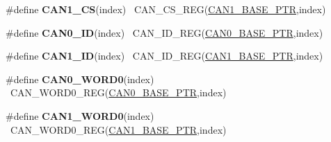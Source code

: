 \begin{DoxyCompactItemize}
\item 
\hypertarget{group___c_a_n___register___accessor___macros_ga70afb0e5509292d14467ead72cc74e03}{}\#define {\bfseries C\+A\+N1\+\_\+\+C\+S}(index)                                                  ~C\+A\+N\+\_\+\+C\+S\+\_\+\+R\+E\+G(\hyperlink{group___c_a_n___peripheral_ga810387eeeb9ccd0e09ae057ff6f0d2ca}{C\+A\+N1\+\_\+\+B\+A\+S\+E\+\_\+\+P\+T\+R},index)\label{group___c_a_n___register___accessor___macros_ga70afb0e5509292d14467ead72cc74e03}

\item 
\hypertarget{group___c_a_n___register___accessor___macros_gac7b043c2201389dfe416e3f5166db6cc}{}\#define {\bfseries C\+A\+N0\+\_\+\+I\+D}(index)                                                  ~C\+A\+N\+\_\+\+I\+D\+\_\+\+R\+E\+G(\hyperlink{group___c_a_n___peripheral_ga1ee8f499e10af9b8e3132e0168e519b9}{C\+A\+N0\+\_\+\+B\+A\+S\+E\+\_\+\+P\+T\+R},index)\label{group___c_a_n___register___accessor___macros_gac7b043c2201389dfe416e3f5166db6cc}

\item 
\hypertarget{group___c_a_n___register___accessor___macros_ga6363290fa493350368cf139282eb1489}{}\#define {\bfseries C\+A\+N1\+\_\+\+I\+D}(index)                                                  ~C\+A\+N\+\_\+\+I\+D\+\_\+\+R\+E\+G(\hyperlink{group___c_a_n___peripheral_ga810387eeeb9ccd0e09ae057ff6f0d2ca}{C\+A\+N1\+\_\+\+B\+A\+S\+E\+\_\+\+P\+T\+R},index)\label{group___c_a_n___register___accessor___macros_ga6363290fa493350368cf139282eb1489}

\item 
\hypertarget{group___c_a_n___register___accessor___macros_gaa0a859ba1ce74eaa3d818f7f3c33b81c}{}\#define {\bfseries C\+A\+N0\+\_\+\+W\+O\+R\+D0}(index)                                            ~C\+A\+N\+\_\+\+W\+O\+R\+D0\+\_\+\+R\+E\+G(\hyperlink{group___c_a_n___peripheral_ga1ee8f499e10af9b8e3132e0168e519b9}{C\+A\+N0\+\_\+\+B\+A\+S\+E\+\_\+\+P\+T\+R},index)\label{group___c_a_n___register___accessor___macros_gaa0a859ba1ce74eaa3d818f7f3c33b81c}

\item 
\hypertarget{group___c_a_n___register___accessor___macros_ga9a7f7bb1b6d0ccc063894f333aa70177}{}\#define {\bfseries C\+A\+N1\+\_\+\+W\+O\+R\+D0}(index)                                            ~C\+A\+N\+\_\+\+W\+O\+R\+D0\+\_\+\+R\+E\+G(\hyperlink{group___c_a_n___peripheral_ga810387eeeb9ccd0e09ae057ff6f0d2ca}{C\+A\+N1\+\_\+\+B\+A\+S\+E\+\_\+\+P\+T\+R},index)\label{group___c_a_n___register___accessor___macros_ga9a7f7bb1b6d0ccc063894f333aa70177}


\end{DoxyCompactItemize}
